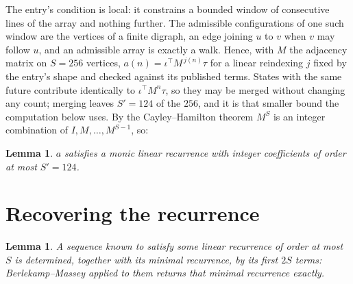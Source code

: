 \documentclass[11pt,a4paper]{article}
\theoremstyle{plain}
\newtheorem{lemma}[theorem]{Lemma}
\theoremstyle{definition}
\begin{document}
The entry's condition is local: it constrains a bounded window of consecutive lines of the
array and nothing further. The admissible configurations of one such window are the vertices
of a finite digraph, an edge joining $u$ to $v$ when $v$ may follow $u$, and an admissible
array is exactly a walk. Hence, with $M$ the adjacency matrix on $S=256$ vertices,
$a(n)=\iota^{\!\top}M^{\,j(n)}\tau$ for a linear reindexing $j$ fixed by the entry's shape
and checked against its published terms. States with the same future contribute identically to $\iota^{\!\top}M^n\tau$, so they may be merged without changing any count; merging leaves $S'=124$ of the $256$, and it is that smaller bound the computation below uses. By the Cayley--Hamilton theorem $M^{S}$ is an
integer combination of $I,M,\dots,M^{S-1}$, so:

\begin{lemma}\label{lem:cf}
$a$ satisfies a monic linear recurrence with integer coefficients of order at most
$S'=124$.
\end{lemma}

\section{Recovering the recurrence}

\begin{lemma}\label{lem:bm}
A sequence known to satisfy some linear recurrence of order at most $S$ is determined, together
with its minimal recurrence, by its first $2S$ terms: Berlekamp--Massey applied to them returns
that minimal recurrence exactly.
\end{lemma}
\end{document}
